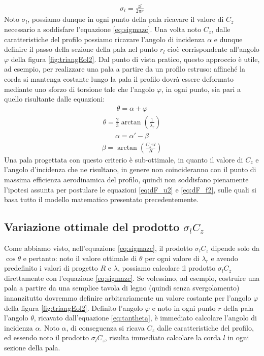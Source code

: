 \begin{align*}
\sigma_l = \frac{z l}{2 \pi r}
\end{align*}
Noto $\sigma_l$, possiamo dunque in ogni punto della pala ricavare il valore di $C_z$ necessario a soddisfare l'equazione \ref{eq:sigmazc}. Una volta noto $C_z$, dalle caratteristiche del profilo possiamo ricavare l'angolo di incidenza $\alpha$ e dunque definire il passo della sezione della pala nel punto $r_l$ cioè corrispondente all'angolo $\varphi$ della figura \ref{fig:triangEol2}. Dal punto di vista pratico, questo approccio è utile, ad esempio, per realizzare una pala a partire da un profilo estruso: affinché la corda si mantenga costante lungo la pala il profilo dovrà essere deformato mediante uno sforzo di torsione tale che l'angolo $\varphi$, in ogni punto, sia pari a quello risultante dalle equazioni:
\begin{align*}
\theta = \alpha + \varphi
\end{align*}
\begin{align*}
\theta = \frac{2}{3} \arctan \left( \frac{1}{\lambda_r} \right)
\end{align*}
\begin{align*}
\alpha = \alpha' - \beta
\end{align*}
\begin{align*}
\beta = \arctan \left( \frac{C_z \pi l}{R} \right)
\end{align*}
Una pala progettata con questo criterio è sub-ottimale, in quanto il valore di $C_z$ e l'angolo d'incidenza che ne risultano, in genere non coincideranno con il punto di massima efficienza aerodinamica del profilo, quindi non soddisfano pienamente l'ipotesi assunta per postulare le equazioni \ref{eq:dF_u2} e \ref{eq:dF_f2}, sulle quali si basa tutto il modello matematico presentato precedentemente.

\subsection{Variazione ottimale del prodotto $\sigma_l C_z$}
Come abbiamo visto, nell'equazione \ref{eq:sigmazc}, il prodotto $\sigma_l C_z$ dipende solo da $\cos \theta$ e pertanto: noto il valore ottimale di $\theta$ per ogni valore di $\lambda_r$ e avendo predefinito i valori di progetto $R$ e $\lambda$, possiamo calcolare il prodotto $\sigma_l C_z$ direttamente con l'equazione \ref{eq:sigmazc}. Se volessimo, ad esempio, costruire una pala a partire da una semplice tavola di legno (quindi senza svergolamento) innanzitutto dovremmo definire arbitrariamente un valore costante per l'angolo $\varphi$ della figura \ref{fig:triangEol2}. Definito l'angolo $\varphi$ e noto in ogni punto $r$ della pala l'angolo $\theta$, ricavato dall'equazione \ref{eq:tantheta}, è immediato calcolare l'angolo di incidenza $\alpha$. Noto $\alpha$, di conseguenza si ricava $C_z$ dalle caratteristiche del profilo, ed essendo noto il prodotto $\sigma_l C_z$, risulta immediato calcolare la corda $l$ in ogni sezione della pala.

